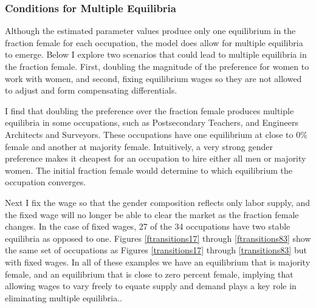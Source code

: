 \documentclass[11pt]{article}
\begin{document}

\subsubsection{Conditions for Multiple Equilibria}
Although the estimated parameter values produce only one equilibrium in the fraction female for each occupation, the model does allow for multiple equilibria to emerge. Below I explore two scenarios that could lead to multiple equilibria in the fraction female. First, doubling the magnitude of the preference for women to work with women, and second, fixing equilibrium wages so they are not allowed to adjust and form compensating differentials.


I find that doubling the preference over the fraction female produces multiple equilibria in some occupations, such as Postsecondary Teachers, and Engineers Architects and Surveyors. These occupations have one equilibrium at close to 0\% female and another at majority female. Intuitively, a very strong gender preference makes it cheapest for an occupation to hire either all men or majority women. The initial fraction female would determine to which equilibrium the occupation converges. 


Next I fix the wage so that the gender composition reflects only labor supply, and the fixed wage will no longer be able to clear the market as the fraction female changes. In the case of fixed wages, 27 of the 34 occupations have two stable equilibria as opposed to one. Figures \ref{ftransitions17} through \ref{ftransitions83} show the same set of occupations as Figures \ref{transitions17} through \ref{transitions83} but with fixed wages. In all of these examples we have an equilibrium that is majority female, and an equilibrium that is close to zero percent female, implying that allowing wages to vary freely to equate supply and demand plays a key role in eliminating multiple equilibria..
\end{document}
